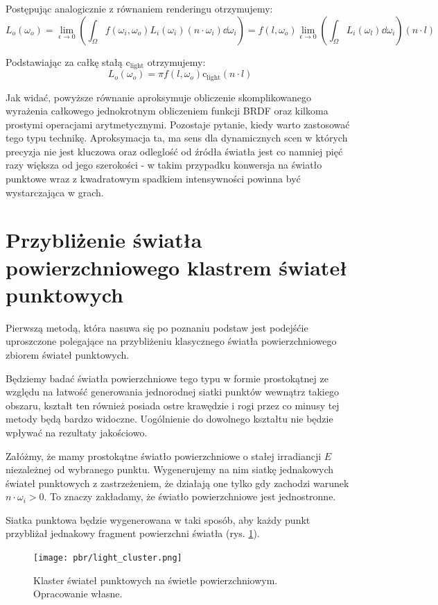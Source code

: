 \documentclass[../main.tex]{subfiles}
\newcommand{\clightcolor}{\text{c}_{\text{light}}}
\begin{document}
Postępując analogicznie z równaniem renderingu otrzymujemy:
\[
	L_o(\omega_o) = \lim_{\epsilon \rightarrow 0} \left(
		\int_{\Omega}{ f(\omega_i, \omega_o) L_i(\omega_i) (n \cdot \omega_i) } \dd\omega_i
	\right) =
	 f(l, \omega_o) \lim_{\epsilon \rightarrow 0} \left(
	 	\int_{\Omega} { L_i(\omega_l) } \dd\omega_i
	 \right)
	 (n \cdot l)
\]

Podstawiając za całkę stałą $\clightcolor$ otrzymujemy:
\[
	L_o(\omega_o) = \pi f(l, \omega_o) \clightcolor (n \cdot l)
\]

Jak widać, powyższe równanie aproksymuje obliczenie skomplikowanego wyrażenia całkowego jednokrotnym obliczeniem funkcji BRDF oraz kilkoma prostymi operacjami arytmetycznymi. Pozostaje pytanie, kiedy warto zastosować tego typu technikę. Aproksymacja ta, ma sens dla dynamicznych scen w których precyzja nie jest kluczowa oraz odleglość od źródła światła jest co namniej pięć razy większa od jego szerokości \cite{RealTimeRendering2008}\cite{lambert_photometria} - w takim przypadku konwersja na światło punktowe wraz z kwadratowym spadkiem intensywności powinna być wystarczająca w grach.


\section{Przybliżenie światła powierzchniowego klastrem świateł punktowych}

Pierwszą metodą, która nasuwa się po poznaniu podstaw jest podejśćie uproszczone polegające na przybliżeniu klasycznego światła powierzchniowego zbiorem świateł punktowych.

Będziemy badać światła powierzchniowe tego typu w formie prostokątnej ze względu na łatwość generowania jednorodnej siatki punktów wewnątrz takiego obszaru, kształt ten również posiada ostre krawędzie i rogi przez co minusy tej metody będą bardzo widoczne. Uogólnienie do dowolnego kształtu nie będzie wpływać na rezultaty jakościowo.

Załóżmy, że mamy prostokątne światło powierzchniowe o stałej irradiancji $E$ niezależnej od wybranego punktu. Wygenerujemy na nim siatkę jednakowych świateł punktowych z zastrzeżeniem, że działają one tylko gdy zachodzi warunek $n \cdot \omega_i > 0 $. To znaczy zakładamy, że światło powierzchniowe jest jednostronne.

Siatka punktowa będzie wygenerowana w taki sposób, aby każdy punkt przybliżał jednakowy fragment powierzchni światła (rys. \ref{fig:PointLightCluster}).

\begin{figure}[ht]
  \centering
  \texttt{[image: pbr/light\_cluster.png]}
  \caption{Klaster świateł punktowych na świetle powierzchniowym. Opracowanie własne.}
  \label{fig:PointLightCluster}
\end{figure}
\end{document}
